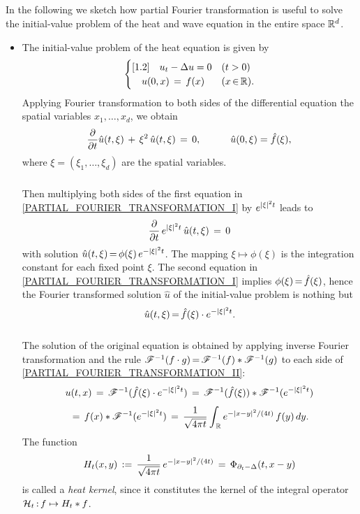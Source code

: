 \documentclass[11pt,twoside]{article}
\begin{document}
\subparagraph{} %
In the following we sketch
how {partial Fourier transformation} is useful to solve
the initial-value problem of the heat and wave equation
in the entire space $\Rd$.

\begin{itemize}
\item[1.]
The initial-value problem of the heat equation is given by
\[
\begin{cases}[1.2]
\quad u_t - \Delta u = 0   & (t > 0)     \\
\quad u(0,x) \= f(x)       & (x \xeof \R). \\
\end{cases}
\]
Applying Fourier transformation to both sides of the differential equation
{\wrt} the spatial variables $x_1,\ldots,x_d$,
we obtain
\begin{equation}\label{PARTIAL_FOURIER_TRANSFORMATION_I}
\frac{\partial}{\partial t} \hat{u}(t,\xi) \, + \, \xi^2 \, \hat{u}(t,\xi)
\= 0,
\quad \quad \quad
\hat{u}(0,\xi) = \hat{f}(\xi),
\end{equation}
where $\xi = (\xi_1,\ldots,\xi_d)$ are the spatial variables.

\subparagraph{}
Then multiplying both sides of the first equation
in \eqref{PARTIAL_FOURIER_TRANSFORMATION_I} by $e^{\abs{\xi} ^2 t}$ leads to
\[
\frac{\partial}{\partial t} \, e^{\abs{\xi} ^2 t} \, \hat{u}(t,\xi) \= 0
\]
with solution
$\hat{u}(t,\xi) \eq \phi(\xi) \, e^{- \abs{\xi} ^2 t}$.
The mapping $\xi \mapsto \phi(\xi)$ is
the integration constant for each fixed point $\xi$.
The second equation in \eqref{PARTIAL_FOURIER_TRANSFORMATION_I}
implies $\phi(\xi) \eq \hat{f}(\xi)$,
hence the Fourier trans\-formed solution $\hat{u}$ 
of the initial-value problem is nothing but
\begin{equation}\label{PARTIAL_FOURIER_TRANSFORMATION_II}
\hat{u}(t,\xi) \eq \hat{f}(\xi) \cdot e^{- \abs{\xi} ^2 t}.
\end{equation}

\subparagraph{}
The solution of the original equation is obtained
by applying inverse Fourier transformation and the rule
$
\FT^{-1}(f \cdot g) \eq \FT^{-1}(f) \ast \FT^{-1}(g)
$
to each side of \eqref{PARTIAL_FOURIER_TRANSFORMATION_II}:
\[
u(t,x) \=
\FT^{-1}(\hat{f}(\xi) \cdot e^{- \abs{\xi} ^2 t}) \=
\FT^{-1}(\hat{f}(\xi)) * \FT^{-1}(e^{- \abs{\xi} ^2 t})
\]
\[
\= f(x) * \FT^{-1}(e^{- \abs{\xi} ^2 t})
\=
\frac{1}{\sqrt{4\pi t}}
\int_{\,\R} e^{-\abs{x-y} ^2/(4t)} \,f(y)\,dy.
\]
The function
\[
H_t(x,y) \eqdef \frac{1}{\sqrt{4\pi t}} \, e^{- \abs{x-y} ^2/(4t)}
\=
\Phi_{\partial_t - \Delta}(t,x-y)
\]
is called a \textit{heat kernel},
since it constitutes the kernel of the integral operator
$\cal{H}_t \: f \mapsto H_t \ast f$.


\end{itemize}
\end{document}
